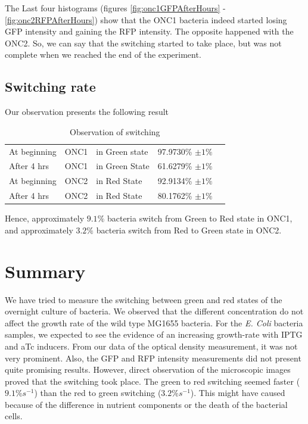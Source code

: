 \documentclass[english,11pt,a4paper]{article}
\begin{document}
The Last four histograms (figures \ref{fig:onc1GFPAfterHours} - \ref{fig:onc2RFPAfterHours}) show that the ONC1 bacteria indeed started losing GFP intensity and gaining the RFP intensity. The opposite happened with the ONC2. So, we can say that the switching started to take place, but was not complete when we reached the end of the experiment. 

\subsection{Switching rate}
Our observation presents the following result

\begin{table}[h]
\centering
\label{switchingRateTable}
\begin{tabular}{lllll}
 	At beginning &  ONC1 &  in Green state	&  97.9730\% $\pm 1\%$ &  \\
	After 4 hrs	 &  ONC1 &  in Green State 	&  61.6279\% $\pm 1\%$ &  \\
	At beginning &  ONC2 &  in Red State	&  92.9134\% $\pm 1\%$ &  \\
	After 4 hrs	 &  ONC2 &  in Red State 	&  80.1762\% $\pm 1\%$ &  \\
\end{tabular}
\caption{Observation of switching}
\end{table}

Hence, approximately $9.1\%$ bacteria switch from Green to Red state in ONC1, and approximately $3.2\%$ bacteria switch from Red to Green state in ONC2. 


\section{Summary}
We have tried to measure the switching between green and red states of the overnight culture of bacteria. We observed that the different concentration do not affect the growth rate of the wild type MG1655 bacteria. For the \textit{E. Coli} bacteria samples, we expected to see the evidence of an increasing growth-rate with IPTG and aTc inducers. From our data of the optical density measurement, it was not very prominent. Also, the GFP and RFP intensity measurements did not present quite promising results. However, direct observation of the microscopic images proved that the switching took place. The green to red switching seemed faster ($9.1\% s^{-1}$) than the red to green switching ($3.2\% s^{-1}$). This might have caused because of the difference in nutrient components or the death of the bacterial cells. 
\end{document}
